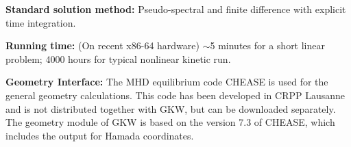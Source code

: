 {\bf Standard solution method:} Pseudo-spectral and finite difference with explicit time integration.

{\bf Running time:} (On recent x86-64 hardware) $\sim$5 minutes for a short linear problem; 4000
hours for typical nonlinear kinetic run.

{\bf Geometry Interface:}  The MHD equilibrium code CHEASE \cite{LUT96} is used for the general geometry calculations. This code has been developed in CRPP Lausanne and
is not distributed together with GKW, but can be downloaded separately. The geometry module of GKW is based on the version 7.3 of CHEASE, which includes the output for Hamada coordinates.\\

\setlength{\parskip}{0pt}
\setlength{\parindent}{0pt}

\tableofcontents

\setlength{\parskip}{8pt}
\setlength{\parindent}{0pt}

\newpage
 

